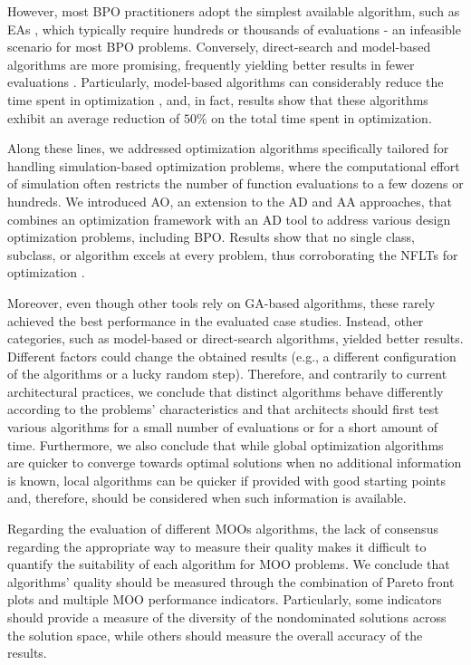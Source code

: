 However, most \ac{BPO} practitioners adopt the simplest available algorithm, such as \acp{EA} \cite{Evins2013}, which typically require hundreds or thousands of evaluations - an infeasible scenario for most \ac{BPO} problems. Conversely, direct-search and model-based algorithms are more promising, frequently yielding better results in fewer evaluations \cite{Waibel2018}. Particularly, model-based algorithms can considerably reduce the time spent in optimization \cite{Wortmann2017GABESTCHOICE}, and, in fact, results show that these algorithms exhibit an average reduction of $50\%$ on the total time spent in optimization.

Along these lines, we addressed optimization algorithms specifically tailored for handling simulation-based optimization problems, where the computational effort of simulation often restricts the number of function evaluations to a few dozens or hundreds. We introduced \ac{AO}, an extension to the \ac{AD} and \ac{AA} approaches, that combines an optimization framework with an \ac{AD} tool to address various design optimization problems, including \ac{BPO}. Results show that no single class, subclass, or algorithm excels at every problem, thus corroborating the \acp{NFLT} for optimization \cite{Wolpert1997NFLT}. 

Moreover, even though other tools rely on \ac{GA}-based algorithms, these rarely achieved the best performance in the evaluated case studies. Instead, other categories, such as model-based or direct-search algorithms, yielded better results. Different factors could change the obtained results (e.g., a different configuration of the algorithms or a lucky random step). Therefore, and contrarily to current architectural practices, we conclude that distinct algorithms behave differently according to the problems' characteristics and that architects should first test various algorithms for a small number of evaluations or for a short amount of time. 
Furthermore, we also conclude that while global optimization algorithms are quicker to converge towards optimal solutions when no additional information is known, local algorithms can be quicker if provided with good starting points and, therefore, should be considered when such information is available.

Regarding the evaluation of different \acp{MOO} algorithms, the lack of consensus regarding the appropriate way to measure their quality makes it difficult to quantify the suitability of each algorithm for \ac{MOO} problems. We conclude that algorithms' quality should be measured through the combination of Pareto front plots and multiple \ac{MOO} performance indicators. Particularly, some indicators should provide a measure of the diversity of the nondominated solutions across the solution space, while others should measure the overall accuracy of the results.

